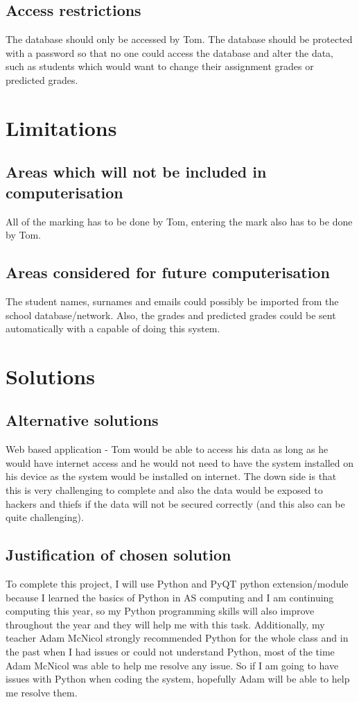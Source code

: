 \subsection{Access restrictions}
The database should only be accessed by Tom. The database should be protected with a password so that no one could access the database and alter the data, such as students which would want to change their assignment grades or predicted grades.

\section{Limitations}

\subsection{Areas which will not be included in computerisation}
All of the marking has to be done by Tom, entering the mark also has to be done by Tom.

\subsection{Areas considered for future computerisation}
The student names, surnames and emails could possibly be imported from the school database/network. Also, the grades and predicted grades could be sent automatically with a capable of doing this system.

\section{Solutions}

\subsection{Alternative solutions}
Web based application - Tom would be able to access his data as long as he would have internet access and he would not need to have the system installed on his device as the system would be installed on internet. The down side is that this is very challenging to complete and also the data would be exposed to hackers and thiefs if the data will not be secured correctly (and this also can be quite challenging).  

\subsection{Justification of chosen solution}
To complete this project, I will use Python and PyQT python extension/module because I learned the basics of Python in AS computing and I am continuing computing this year, so my Python programming skills will also improve throughout the year and they will help me with this task. Additionally, my teacher Adam McNicol strongly recommended Python for the whole class and in the past when I had issues or could not understand Python, most of the time Adam McNicol was able to help me resolve any issue. So if I am going to have issues with Python when coding the system, hopefully Adam will be able to help me resolve them.

